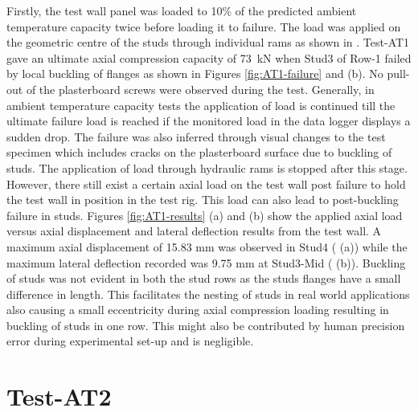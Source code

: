 Firstly, the test wall panel was loaded to 10\% of the predicted ambient temperature capacity twice before loading it to failure. The load was applied on the geometric centre of the studs through individual rams as shown in . Test-AT1 gave an ultimate axial compression capacity of 73~kN when Stud3 of Row-1 failed by local buckling of flanges as shown in Figures \ref{fig:AT1-failure}  and (b). No pull-out of the plasterboard screws were observed during the test. Generally, in ambient temperature capacity tests the application of load is continued till the ultimate failure load is reached if the monitored load in the data logger displays a sudden drop. The failure was also inferred through visual changes to the test specimen which includes cracks on the plasterboard surface due to buckling of studs. The application of load through hydraulic rams is stopped after this stage. However, there still exist a certain axial load on the test wall post failure to hold the test wall in position in the test rig. This load can also lead to post-buckling failure in studs. Figures \ref{fig:AT1-results} (a) and (b) show the applied axial load versus axial displacement and lateral deflection results from the test wall. A maximum axial displacement of 15.83 mm was observed in Stud4 ( (a)) while the maximum lateral deflection recorded was 9.75 mm at Stud3-Mid ( (b)). Buckling of studs was not evident in both the stud rows as the studs flanges have a small difference in length. This facilitates the nesting of studs in real world applications also causing a small eccentricity during axial compression loading resulting in buckling of studs in one row. This might also be contributed by human precision error during experimental set-up and is negligible.

\section{Test-AT2}

